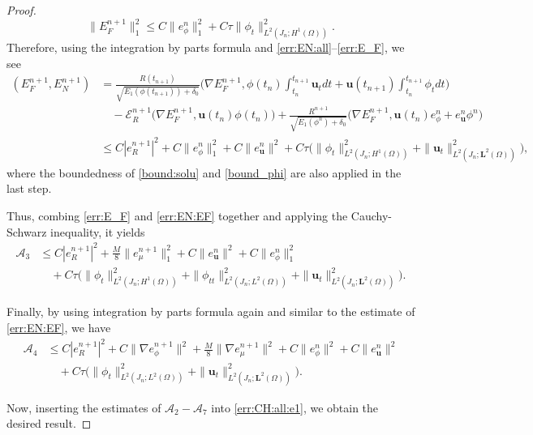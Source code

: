 \documentclass[10pt,a4paper]{amsart}
\newcommand{\malA}{\mathcal{A}}
\newcommand{\malE}{\mathcal{E}}
\newcommand{\mbfL}{\mathbf{L}}
\begin{document}
\begin{proof}
\begin{equation}
		\|E_F^{n+1}\|_1^2 \le		C\|e_\phi^n\|_1^2  +C \tau \|\phi_t\|^2_{L^2(J_n ; H^1(\Omega))}.
	\end{equation}
	Therefore, using the integration by parts formula and \eqref{err:EN:all}--\eqref{err:E_F}, we see 
	\begin{equation} \label{err:EN:EF}
		\begin{aligned}
			 (E_F^{n+1}, E_N^{n+1}) 	& = \frac{R(t_{n+1})}{\sqrt{E_1(\phi(t_{n+1}))+\delta_0}}
			\big(\nabla E_F^{n+1},  \phi(t_n)\int_{t_n}^{t_{n+1}} \bm u_t dt+\bm u (t_{n+1}) \int_{t_n}^{t_{n+1}} \phi_t dt\big) \\
			& \quad - \malE_R^{n+1} \big(\nabla E_F^{n+1},  \bm u(t_{n}) \phi(t_{n})\big) 
			+\frac{R^{n+1}}{\sqrt{E_1(\phi^n)+\delta_0}}\big(\nabla E_F^{n+1}, \bm u(t_{n}) e_\phi^n +e_{\bm u}^n \phi^n\big)\\
			&  \leq C|e_R^{n+1}|^2 +C\|e_\phi^n\|_1^2+C\|e_{\bm u}^n\|^2
			+C\tau\big( \|\phi_t\|_{L^2(J_n ; H^1(\Omega))}^2 + \|\bm u_t\|_{L^2(J_n; \mbfL^2(\Omega))}^2 \big),
		\end{aligned}
	\end{equation}
	where the boundedness of \eqref{bound:solu}  and \eqref{bound_phi} are also applied in the last step.
	
	Thus, combing \eqref{err:E_F} and \eqref{err:EN:EF} together and applying the Cauchy-Schwarz inequality, it yields
	\begin{equation*} 
		\begin{aligned}
			\malA_{3} 
			&  \leq C|e_R^{n+1}|^2+\frac{M}{8}\|e_\mu^{n+1}\|_1^2
			+C\|e_{\bm u}^n\|^2+C\|e_\phi^n\|_1^2\\ %
			& \quad +C \tau \big(\|\phi_t\|_{L^2(J_n; H^1(\Omega))}^2
			+\|\phi_{tt}\|_{L^2(J_n; L^2(\Omega))}^2+\|\bm u_t\|_{L^2(J_n; \mbfL^2(\Omega))}^2\big).
		\end{aligned}
	\end{equation*}
	
	Finally, by using integration by parts formula again and similar to the estimate of \eqref{err:EN:EF}, we have
	\begin{equation*} 
		\begin{aligned}
			\malA_{4} 
			& \leq C|e_R^{n+1}|^2+C\|\nabla e_\phi^{n+1}\|^2+ \frac{M}{8}\|\nabla e_\mu^{n+1}\|^2 +C\|e_\phi^n\|^2+C\|e_{\bm u}^n\|^2\\
			& \quad +C \tau \big(\|\phi_t\|_{L^2(J_n ; L^2(\Omega))}^2+\|\bm u_t\|_{L^2(J_n ; \mbfL^2(\Omega))}^2\big).
		\end{aligned}
	\end{equation*}
	
Now, inserting the estimates of $\malA_2-\malA_{7}$ into \eqref{err:CH:all:e1}, we obtain the desired result.
\end{proof}
\end{document}
